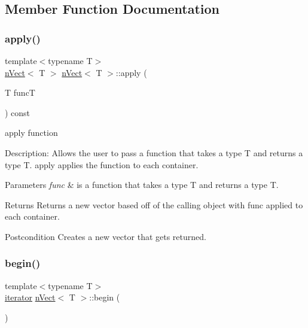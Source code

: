 \subsection{Member Function Documentation}
\mbox{\label{classnVect_a35964beca3a57fad4f69ddd6be16cc91}} 
\subsubsection{\texorpdfstring{apply()}{apply()}}
{\footnotesize\ttfamily template$<$typename T$>$ \\
\hyperlink{classnVect}{n\+Vect}$<$ T $>$ \hyperlink{classnVect}{n\+Vect}$<$ T $>$\+::apply (\begin{DoxyParamCaption}\item[{T }]{funcT }\end{DoxyParamCaption}) const}



apply function 

Description\+: Allows the user to pass a function that takes a type T and returns a type T. apply applies the function to each container. 
\begin{DoxyParams}{Parameters}
{\em func} & is a function that takes a type T and returns a type T. \\
\hline
\end{DoxyParams}
\begin{DoxyReturn}{Returns}
Returns a new vector based off of the calling object with func applied to each container. 
\end{DoxyReturn}
\begin{DoxyPostcond}{Postcondition}
Creates a new vector that gets returned. 
\end{DoxyPostcond}
\mbox{\label{classnVect_a0daf09e1f15ac627815d57f777ecc417}} 
\subsubsection{\texorpdfstring{begin()}{begin()}}
{\footnotesize\ttfamily template$<$typename T$>$ \\
\hyperlink{classnVect_1_1iterator}{iterator} \hyperlink{classnVect}{n\+Vect}$<$ T $>$\+::begin (\begin{DoxyParamCaption}{ }\end{DoxyParamCaption})\hspace{0.3cm}{\ttfamily [inline]}}



